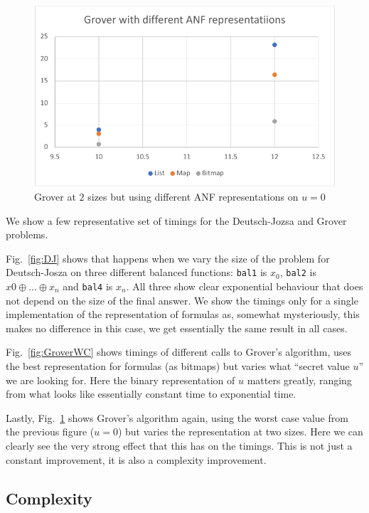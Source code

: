 \documentclass[sigplan,screen]{acmart}
\theoremstyle{definition}
\begin{document}
\begin{figure}
\includegraphics[scale=0.6]{../execution/RetroPE/Grover1.pdf}
  \caption{\label{fig:GroverImpl} Grover at $2$ sizes but using different ANF representations on $u=0$}
\end{figure}

We show a few representative set of timings for the Deutsch-Jozsa and
Grover problems.

Fig.~\ref{fig:DJ} shows that happens when we vary the
size of the problem for Deutsch-Josza on three different balanced
functions: \texttt{bal1} is $x_0$, \texttt{bal2} is $x0\oplus\ldots\oplus x_n$
and \texttt{bal4} is $x_n$. All three show
clear exponential behaviour that does not depend on the size of the final
answer. We show the timings only for a single implementation of the
representation of formulas as, somewhat mysteriously, this makes no
difference in this case, we get essentially the same result in all cases.

Fig.~\ref{fig:GroverWC} shows timings of different calls to Grover's
algorithm, uses the best representation for formulas (as bitmaps) but varies
what ``secret value $u$'' we are looking for. Here
the binary representation of $u$ matters greatly, ranging from what looks
like essentially constant time to exponential time.

Lastly, Fig.~\ref{fig:GroverImpl} shows Grover's algorithm again, using the
worst case value from the previous figure ($u=0$) but varies the representation
at two sizes. Here we can clearly see the very strong effect that this has
on the timings. This is not just a constant improvement, it is also a complexity
improvement.

\subsection{Complexity}
\end{document}
